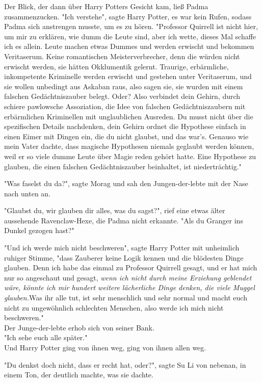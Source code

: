 {Der Blick, der dann über Harry Potters Gesicht kam, ließ Padma zusammenzucken. "Ich verstehe", sagte Harry Potter, es war kein Rufen, sodass Padma sich anstrengen musste, um es zu hören. "Professor Quirrell ist nicht hier, um mir zu erklären, wie dumm die Leute sind, aber ich wette, dieses Mal schaffe ich es allein. Leute machen etwas Dummes und werden erwischt und bekommen Veritaserum. Keine romantischen Meisterverbrecher, denn die würden nicht erwischt werden, sie hätten Okklumentik gelernt. Traurige, erbärmliche, inkompetente Kriminelle werden erwischt und gestehen unter Veritaserum, und sie wollen unbedingt aus Askaban raus, also sagen sie, sie wurden mit einem falschen Gedächtniszauber belegt. Oder? Also verbindet dein Gehirn, durch schiere pawlowsche Assoziation, die Idee von falschen Gedächtniszaubern mit erbärmlichen Kriminellen mit unglaublichen Ausreden. Du musst nicht über die spezifischen Details nachdenken, dein Gehirn ordnet die Hypothese einfach in einen Eimer mit Dingen ein, die du nicht glaubst, und das war's. Genauso wie mein Vater dachte, dass magische Hypothesen niemals geglaubt werden können, weil er so viele dumme Leute über Magie reden gehört hatte. Eine Hypothese zu glauben, die einen falschen Gedächtniszauber beinhaltet, ist niederträchtig."

"Was faselst du da?", sagte Morag und sah den Jungen-der-lebte mit der Nase nach unten an.

"Glaubst du, wir glauben dir alles, was du sagst?", rief eine etwas älter aussehende Ravenclaw-Hexe, die Padma nicht erkannte. "Als du Granger ins Dunkel gezogen hast?"

"Und ich werde mich nicht beschweren", sagte Harry Potter mit unheimlich ruhiger Stimme, "dass Zauberer keine Logik kennen und die blödesten Dinge glauben. Denn ich habe das einmal zu Professor Quirrell gesagt, und er hat mich nur so angeschaut und gesagt, \emph{wenn ich nicht durch meine Erziehung geblendet wäre, könnte ich mir hundert weitere lächerliche Dinge denken, die viele Muggel glauben.}Was ihr alle tut, ist sehr menschlich und sehr normal und macht euch nicht zu ungewöhnlich schlechten Menschen, also werde ich mich nicht beschweren."\\ Der Junge-der-lebte erhob sich von seiner Bank.\\ "Ich sehe euch alle später."\\ Und Harry Potter ging von ihnen weg, ging von ihnen allen weg.

"Du denkst doch nicht, dass er recht hat, oder?", sagte Su Li von nebenan, in einem Ton, der deutlich machte, was sie dachte.

}
